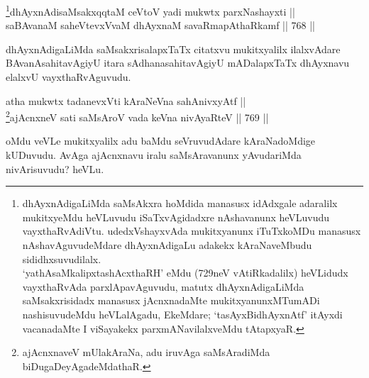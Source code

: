 

\begin{shl}
\footnote{dhAyxnAdigaLiMda saMsAkxra hoMdida manasusx idAdxgale adaralilx mukitxyeMdu heVLuvudu iSaTxvAgidadxre nAshavanunx heVLuvudu vayxthaRvAdiVtu. udedxVshayxvAda mukitxyanunx iTuTxkoMDu manasusx nAshavAguvudeMdare dhAyxnAdigaLu adakekx kAraNaveMbudu sididhxsuvudilalx.\\
`yathAsaMkalipxtashAcxthaRH' eMdu (729neV vAtiRkadalilx) heVLidudx vayxthaRvAda parxlApavAguvudu, matutx dhAyxnAdigaLiMda saMsakxrisidadx manasusx jAcnxnadaMte mukitxyanunxMTumADi nashisuvudeMdu heVLalAgadu, EkeMdare; `tasAyxBidhAyxnAtf' itAyxdi vacanadaMte I viSayakekx parxmANavilalxveMdu tAtapxyaR.}dhAyxnAdisaMsakxqqtaM ceVtoV yadi mukwtx parxNashayxti || \\
saBAvanaM saheVtevxVvaM dhAyxnaM savaRmapAthaRkamf \hfill || 768 ||  
\end{shl}

\begin{artha} 
dhAyxnAdigaLiMda saMsakxrisalapxTaTx citatxvu mukitxyalilx ilalxvAdare 
BAvanAsahitavAgiyU itara sAdhanasahitavAgiyU mADalapxTaTx dhAyxnavu 
elalxvU vayxthaRvAguvudu.
\end{artha}


\begin{shl}
atha mukwtx tadanevxVti kAraNeVna sahAnivxyAtf || \\
\footnote{ajAcnxnaveV mUlakAraNa, adu iruvAga saMsAradiMda biDugaDeyAgadeMdathaR.}ajAcnxneV sati saMsAroV vada keVna nivAyaRteV \hfill || 769 ||  
\end{shl}


\begin{artha} 
oMdu veVLe mukitxyalilx adu baMdu seVruvudAdare kAraNadoMdige kUDuvudu. AvAga ajAcnxnavu iralu saMsAravanunx yAvudariMda nivArisuvudu? heVLu.
\end{artha}



